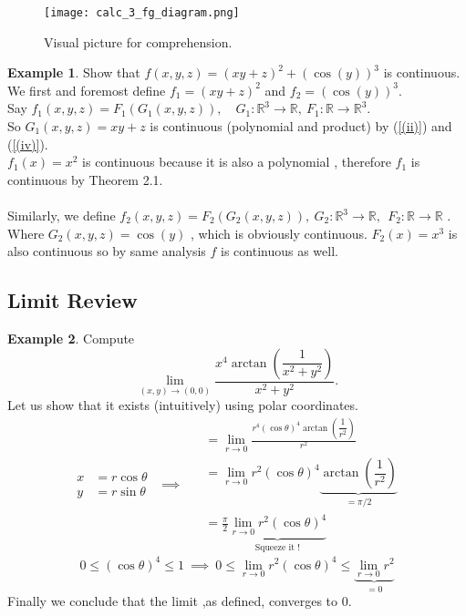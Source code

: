 \documentclass[
	12pt,
	]{article}
\newcommand{\R}{\mathbb{R}}
\theoremstyle{custom}
\theoremstyle{custom}
\theoremstyle{custom}
\theoremstyle{custom}
\theoremstyle{custom}
\theoremstyle{definition}
\newtheorem{example}{Example}[section]
\theoremstyle{example}
\theoremstyle{note}
\theoremstyle{remark}
\theoremstyle{example}
\newcounter{theo}[section]\setcounter{theo}{0}
\numberwithin{equation}{subsection}
\let\oldref\ref
\renewcommand{\ref}[1]{(\oldref{#1})}
\begin{document}
		\begin{figure}[H]
				\centering
				\texttt{[image: calc\_3\_fg\_diagram.png]}
				\captionsetup{margin=1cm, justification=raggedright}\caption{Visual picture for comprehension.}
		\end{figure}
		
		\begin{example}
			Show that  $f(x,y,z) = (xy + z)^{2} + (\cos(y))^{3}$ is continuous. \\
			We first and foremost define $f_{1} = (xy + z)^{2}$ and $f_{2} =  (\cos(y))^{3}$.\\
			Say $f_{1}(x,y,z) = F_{1}(G_{1}(x,y,z)), \quad G_{1} : \mathbb{R}^{3} \to \R  , \ F_{1}: \R \to \mathbb{R}^{3}$. \\
			So $G_{1} (x,y,z) = xy + z $ is continuous (polynomial and product) by \ref{(ii)} and \ref{(iv)}. \\
			$ f_{1}(x) =x^{2}$ is continuous because it is also a polynomial , therefore $f_{1} $ is continuous by Theorem 2.1. \\
			\\
			Similarly, we define $f_{2}(x,y,z) = F_{2}(G_{2}(x,y,z)) ,  \  G_{2} : \mathbb{R}^{3} \to \R , \ \ F_{2} : \R \to \R$ . \\
			Where $G_{2}(x,y,z) = \cos(y) $ , which is obviously continuous. $F_{2}(x) = x^{3}$ is also continuous so by same analysis $f$ is continuous as well.  
		\end{example}
		
		\subsection{Limit Review}
		
		\begin{example}
			Compute $$ \lim_{(x,y) \to (0,0)} \frac{x^{4} \arctan(\dfrac{1}{x^{2}+y^{2}})}{x^{2}+y^{2}}.$$
			Let us show that it exists (intuitively) using polar coordinates. 
			\begin{equation*}
				\begin{split}
					x &= r \cos \theta \\
					y &= r \sin \theta
				\end{split}
				 \ \ \implies \ \
				\begin{split}
					&= \lim_{r \to 0} \frac{r^{4}(\cos\theta)^{4} \arctan(\dfrac{1}{r^{2}})}{r^{2}} \\
					&= \lim_{r \to 0} r^{2}(\cos \theta )^{4} \underbrace{\arctan(\dfrac{1}{r^{2}})}_{= \pi/2} \\
					&= \frac{\pi}{2} \underbrace{\lim_{r \to 0} r^{2} (\cos\theta )^{4}}_{\text{Squeeze it !}}
				\end{split}
			\end{equation*}
			\begin{equation*}
				0 \le (\cos\theta)^{4} \le 1 \  \implies \ 0 \le \lim_{r\to 0} r^{2}(\cos\theta )^{4} \le \underbrace{\lim_{r \to 0} r^{2}}_{=0}
			\end{equation*}
			Finally we conclude that the limit ,as defined, converges to $0$.
		\end{example}
		
\end{document}
